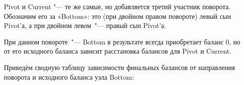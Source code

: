 Pivot и Current "--- те же самые, но добавляется третий участник поворота.
Обозначим его за «Bottom»: это (при двойном правом повороте) левый сын Pivot'а,
а при двойном левом "--- правый сын Pivot'а.

При данном повороте "--- Bottom в результате всегда приобретает баланс $0$,
но от его исходного баланса зависит расстановка балансов для Pivot и Current.

Приведём сводную таблицу зависимости финальных балансов от направления поворота и исходного баланса узла Bottom:


